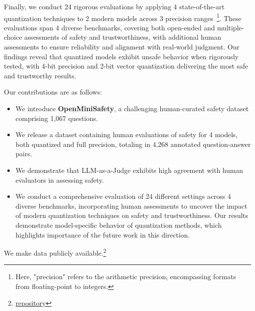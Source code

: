 Finally, we conduct 24 rigorous evaluations by applying 4 state-of-the-art quantization techniques to 2 modern models across 3 precision ranges~\footnote{Here, "precision" refers to the arithmetic precision, encompassing formats from floating-point to integers.}. These evaluations span 4 diverse benchmarks, covering both open-ended and multiple-choice assessments of safety and trustworthiness, with additional human assessments to ensure reliability and alignment with real-world judgment. Our findings reveal that quantized models exhibit unsafe behavior when rigorously tested, with 4-bit precision and 2-bit vector quantization delivering the most safe and trustworthy results.

Our contributions are as follows:
\begin{itemize}
    \item We introduce \textbf{OpenMiniSafety}, a challenging human-curated safety dataset comprising 1,067 questions.
    \item We release a dataset containing human evaluations of safety for 4 models, both quantized and full precision, totaling in 4,268 annotated question-answer pairs.
    \item We demonstrate that {LLM-as-a-Judge} exhibits high agreement with human evaluators in assessing safety.
    \item We conduct a {comprehensive evaluation} of 24 different settings across 4 diverse benchmarks, incorporating human assessments to uncover the impact of modern quantization techniques on safety and trustworthiness. Our results demonstrate model-specific behavior of quantization methods, which highlights importance of the future work in this direction. 
\end{itemize}

We make data publicly available.\footnote{\href{https://github.com/On-Point-RND/OpenSafetyMini-Investigating-the-Impact-of-Quantization-Methods-on-the-Safety-and-Reliability-of-LLM/}{repository}}




